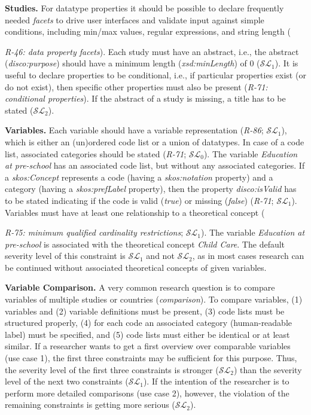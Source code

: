 \documentclass{llncs}
\begin{document}
\textbf{Studies.}
For datatype properties it should be possible to declare frequently needed \emph{facets} to drive user interfaces and validate input against simple conditions, including min/max values, regular expressions, and string length ({\emph{R-46: data property facets}).
Each study must have an abstract, i.e., the abstract (\emph{disco:purpose}) should have a minimum length (\emph{xsd:minLength}) of 0 ($\mathcal{SL}_{1}$).
It is useful to declare properties to be conditional, i.e., if particular properties exist (or do not exist), then specific other properties must also be present (\emph{R-71: conditional properties}).
If the abstract of a study is missing, a title has to be stated ($\mathcal{SL}_{2}$).

\textbf{Variables.}
Each variable should have a variable representation (\emph{R-86}; $\mathcal{SL}_{1}$), which is either an (un)ordered code list or a union of datatypes.
In case of a code list, associated categories should be stated (\emph{R-71}; $\mathcal{SL}_{0}$).
The variable \emph{Education at pre-school} has an associated code list, but without any associated categories.
If a {\em skos:Concept} represents a code (having a {\em skos:notation} property) and a category (having a {\em skos:prefLabel} property), 
then the property {\em disco:isValid} has to be stated indicating if the code is valid (\emph{true}) or missing (\emph{false}) (\emph{R-71}; $\mathcal{SL}_{1}$).
Variables must have at least one relationship to a theoretical concept ({\emph{R-75: minimum qualified cardinality restrictions}; $\mathcal{SL}_{1}$).
The variable \emph{Education at pre-school} is associated with the theoretical concept \emph{Child Care}. 
The default severity level of this constraint is $\mathcal{SL}_{1}$ and not $\mathcal{SL}_{2}$, as in most cases research can be continued without associated theoretical concepts of given variables.

\textbf{Variable Comparison.}
A very common research question is to compare variables of multiple studies or countries (\emph{comparison}).
To compare variables, 
(1) variables and (2) variable definitions must be present,
(3) code lists must be structured properly,
(4) for each code an associated category (human-readable label) must be specified, and
(5) code lists must either be identical or at least similar.
If a researcher wants to get a first overview over comparable variables (use case 1), 
the first three constraints may be sufficient for this purpose.
Thus, the severity level of the first three constraints is stronger ($\mathcal{SL}_{2}$) than the severity level of the next two constraints ($\mathcal{SL}_{1}$).
If the intention of the researcher is to perform more detailed comparisons (use case 2), however, the violation of the remaining constraints is getting more serious ($\mathcal{SL}_{2}$).

}}
\end{document}
